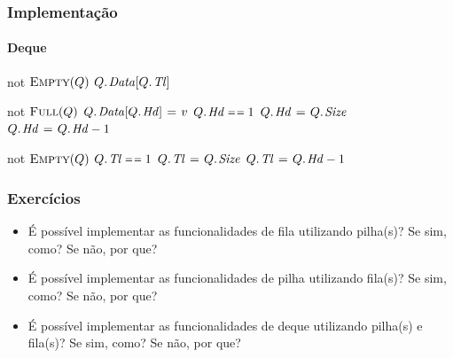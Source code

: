 \documentclass{beamer}
\begin{document}
\begin{frame}

  \frametitle{Implementação}
  \framesubtitle{Deque}

\begin{codebox}
\li  \If not $\textnormal{\scshape Empty}(Q)$
\li    \Then \Return $\attrib{Q}{Data}[\attrib{Q}{Tl}]$
     \End
\end{codebox}
\begin{codebox}
\li  \If not $\textnormal{\scshape Full}(Q)$
\li    \Then $\attrib{Q}{Data}[\attrib{Q}{Hd}] \gets v$
\li      \If $\attrib{Q}{Hd} \isequal 1$
\li        \Then $\attrib{Q}{Hd} \gets \attrib{Q}{Size}$
\li        \Else $\attrib{Q}{Hd} \gets \attrib{Q}{Hd} - 1$
         \End
     \End
\end{codebox}
\begin{codebox}
\li  \If not $\textnormal{\scshape Empty}(Q)$
\li    \Then \If $\attrib{Q}{Tl} \isequal 1$
\li      \Then $\attrib{Q}{Tl} \gets \attrib{Q}{Size}$
\li      \Else $\attrib{Q}{Tl} \gets \attrib{Q}{Hd} - 1$
       \End
     \End
\end{codebox}

\end{frame}

\begin{frame}

  \frametitle{Exercícios}

  \begin{itemize}

    \item É possível implementar as funcionalidades de fila utilizando pilha(s)?
      Se sim, como? Se não, por que?

    \item É possível implementar as funcionalidades de pilha utilizando fila(s)?
      Se sim, como? Se não, por que?

    \item É possível implementar as funcionalidades de deque utilizando pilha(s)
      e fila(s)?  Se sim, como? Se não, por que?

  \end{itemize}
\end{frame}



\end{document}
